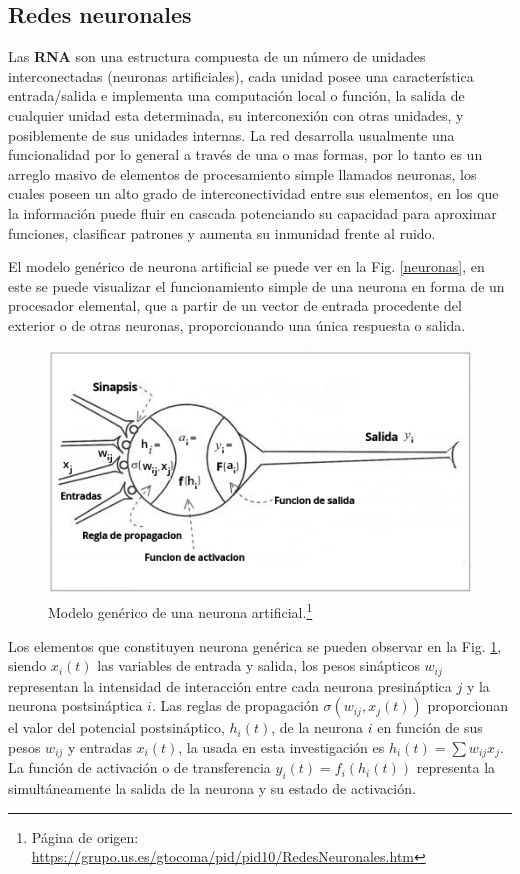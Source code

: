 \subsection{Redes neuronales}
Las \textbf{RNA} son una estructura compuesta de un número de unidades interconectadas (neuronas artificiales), cada unidad posee una característica entrada/salida e implementa una computación local o función, la salida de cualquier unidad esta determinada, su interconexión con otras unidades, y posiblemente de sus unidades internas. La red desarrolla usualmente una funcionalidad por lo general a través de una o mas formas, por lo tanto es un arreglo masivo de elementos de procesamiento simple llamados neuronas, los cuales poseen un alto grado de interconectividad entre sus elementos, en los que la información puede fluir en cascada potenciando su capacidad para aproximar funciones, clasificar patrones y aumenta su inmunidad frente al ruido. 

El modelo genérico de neurona artificial se puede ver en la Fig. \ref{neuronas}, en este se puede visualizar el funcionamiento simple de una neurona en forma de un procesador elemental, que a partir de un vector de entrada procedente del exterior o de otras neuronas, proporcionando una única respuesta o salida.

\begin{figure}[!b]
\centering
\includegraphics[width=.7\textwidth]{Simulacion/imagenes/generico.png}
\caption[Modelo genérico de una neurona artificial.]{Modelo genérico de una neurona artificial.\footnote{Página de origen: \href{https://grupo.us.es/gtocoma/pid/pid10/RedesNeuronales.htm}{https://\-gru\-po.\-us.\-es/\-gto\-coma/\-pid/\-pid10/\-Re\-des\-Neu\-ro\-na\-les.\-htm}}}
\label{generico}
\end{figure}

Los elementos que constituyen neurona genérica se pueden observar en la Fig. \ref{generico}, siendo $x_i(t)$ las variables de entrada y salida, los pesos sinápticos $w_{ij}$ representan la intensidad de interacción entre cada neurona presináptica $j$ y la neurona postsináptica $i$. Las reglas de propagación $\sigma(w_{ij}, x_j(t))$ proporcionan el valor del potencial postsináptico, $h_i(t)$, de la neurona $i$ en función de sus pesos $w_{ij}$ y entradas $x_i(t)$, la usada en esta investigación es $h_i (t) = \sum w_{ij} x_j$. La función de activación o de transferencia $y_i(t) = f_i(h_i(t))$ representa la simultáneamente la salida de la neurona y su estado de activación. 

